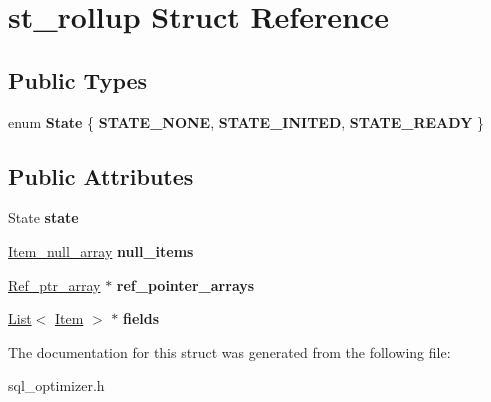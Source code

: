 \hypertarget{structst__rollup}{}\section{st\+\_\+rollup Struct Reference}
\label{structst__rollup}
\subsection*{Public Types}
\begin{DoxyCompactItemize}
\item 
\mbox{\label{structst__rollup_a06850fa7c944d7c984304bf41e68e0b4}} 
enum {\bfseries State} \{ {\bfseries S\+T\+A\+T\+E\+\_\+\+N\+O\+NE}, 
{\bfseries S\+T\+A\+T\+E\+\_\+\+I\+N\+I\+T\+ED}, 
{\bfseries S\+T\+A\+T\+E\+\_\+\+R\+E\+A\+DY}
 \}
\end{DoxyCompactItemize}
\subsection*{Public Attributes}
\begin{DoxyCompactItemize}
\item 
\mbox{\label{structst__rollup_a34042c1eecbcb27084cbf8725621a33f}} 
State {\bfseries state}
\item 
\mbox{\label{structst__rollup_a9bfbeb140aac96250eee40eb6318b446}} 
\mbox{\hyperlink{classBounds__checked__array}{Item\+\_\+null\+\_\+array}} {\bfseries null\+\_\+items}
\item 
\mbox{\label{structst__rollup_a7aec9c7ee5d0d840e792012c005131ab}} 
\mbox{\hyperlink{classBounds__checked__array}{Ref\+\_\+ptr\+\_\+array}} $\ast$ {\bfseries ref\+\_\+pointer\+\_\+arrays}
\item 
\mbox{\label{structst__rollup_a254b5cc852618bb75dafe251f5ad8757}} 
\mbox{\hyperlink{classList}{List}}$<$ \mbox{\hyperlink{classItem}{Item}} $>$ $\ast$ {\bfseries fields}
\end{DoxyCompactItemize}


The documentation for this struct was generated from the following file\+:\begin{DoxyCompactItemize}
\item 
sql\+\_\+optimizer.\+h\end{DoxyCompactItemize}
